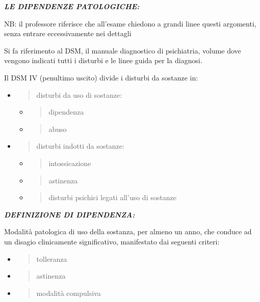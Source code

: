 \documentclass[]{article}
\date{}
\begin{document}
\textbf{\emph{LE DIPENDENZE PATOLOGICHE:}}

NB: il professore riferisce che all'esame chiedono a grandi linee questi
argomenti, senza entrare eccessivamente nei dettagli

Si fa riferimento al DSM, il manuale diagnostico di psichiatria, volume
dove vengono indicati tutti i disturbi e le linee guida per la diagnosi.

Il DSM IV (penultimo uscito) divide i disturbi da sostanze in:

\begin{itemize}
\item
  \begin{quote}
  disturbi da uso di sostanze:
  \end{quote}

  \begin{itemize}
  \item
    \begin{quote}
    dipendenza
    \end{quote}
  \item
    \begin{quote}
    abuso
    \end{quote}
  \end{itemize}
\item
  \begin{quote}
  disturbi indotti da sostanze:
  \end{quote}

  \begin{itemize}
  \item
    \begin{quote}
    intossicazione
    \end{quote}
  \item
    \begin{quote}
    astinenza
    \end{quote}
  \item
    \begin{quote}
    disturbi psichici legati all'uso di sostanze
    \end{quote}
  \end{itemize}
\end{itemize}

\textbf{\emph{DEFINIZIONE DI DIPENDENZA:}}

Modalità patologica di uso della sostanza, per almeno un anno, che
conduce ad un disagio clinicamente significativo, manifestato dai
seguenti criteri:

\begin{itemize}
\item
  \begin{quote}
  tolleranza
  \end{quote}
\item
  \begin{quote}
  astinenza
  \end{quote}
\item
  \begin{quote}
  modalità compulsiva
  \end{quote}
\end{itemize}
\end{document}
